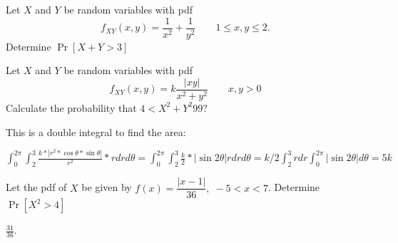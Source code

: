 \documentclass[../main.tex]{subfiles}
\begin{document}
\begin{example}
	Let $X$ and $Y$ be random variables with pdf $$f_{XY}(x,y) = \dfrac{1}{x^2} + 
	\dfrac{1}{y^2} \qquad 1\leq x,y \leq 2. $$ Determine $\Pr[X+Y>3]$
\end{example}
\begin{example}
	Let $X$ and $Y$ be random variables with pdf 
	$$f_{XY}(x,y) = k \dfrac{|xy|}{x^2+y^2} \qquad x,y > 0$$ Calculate the probability
	that $4 < X^2+Y^2 9 9?$
\end{example}

\begin{solution}

This is a double integral to find the area:

$\int_{0}^{2\pi}\int_{2}^{3}\frac{k*|r^2*\cos{\theta}*\sin{\theta}|}{r^2}*rdrd\theta=\int_{0}^{2\pi}\int_{2}^{3}\frac{k}{2}*|\sin{2\theta}|rdrd\theta=k/2\int_{2}^{3}rdr\int_{0}^{2\pi}|\sin{2\theta}|d\theta=5k$

\end{solution}



\begin{example}
	Let the pdf of $X$ be given by $f(x) = \dfrac{|x-1|}{36},\;-5<x<7$. Determine
	$\Pr[X^2 > 4]$
\end{example}
\begin{solution}[Answer.]
$\frac{31}{36}$. 
\end{solution}
\end{document}
